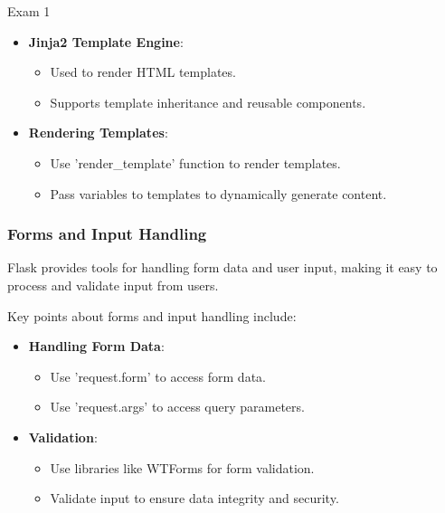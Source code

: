 \begin{examnotes}{Exam 1}
\begin{highlight}[Templates]
        \begin{itemize}
            \item \textbf{Jinja2 Template Engine}:
                \begin{itemize}
                    \item Used to render HTML templates.
                    \item Supports template inheritance and reusable components.
                \end{itemize}
            \item \textbf{Rendering Templates}:
                \begin{itemize}
                    \item Use 'render\_template' function to render templates.
                    \item Pass variables to templates to dynamically generate content.
                \end{itemize}
        \end{itemize}
    \end{highlight}
    
    \subsubsection*{Forms and Input Handling}
    
    Flask provides tools for handling form data and user input, making it easy to process and validate input from users.
    
    \begin{highlight}
        Key points about forms and input handling include:
        
        \begin{itemize}
            \item \textbf{Handling Form Data}:
                \begin{itemize}
                    \item Use 'request.form' to access form data.
                    \item Use 'request.args' to access query parameters.
                \end{itemize}
            \item \textbf{Validation}:
                \begin{itemize}
                    \item Use libraries like WTForms for form validation.
                    \item Validate input to ensure data integrity and security.
                \end{itemize}
        \end{itemize}
    \end{highlight}
    

\end{examnotes}
